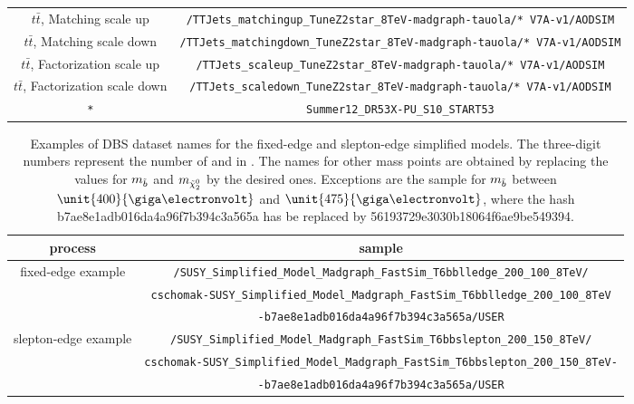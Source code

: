 \begin{table}[htb]
\begin{tabular}{c|c}
$t\bar{t}$, Matching scale up & \verb+/TTJets_matchingup_TuneZ2star_8TeV-madgraph-tauola/* V7A-v1/AODSIM+ \\
$t\bar{t}$, Matching scale down & \verb+/TTJets_matchingdown_TuneZ2star_8TeV-madgraph-tauola/* V7A-v1/AODSIM+ \\
$t\bar{t}$, Factorization scale up & \verb+/TTJets_scaleup_TuneZ2star_8TeV-madgraph-tauola/* V7A-v1/AODSIM+ \\
$t\bar{t}$, Factorization scale down & \verb+/TTJets_scaledown_TuneZ2star_8TeV-madgraph-tauola/* V7A-v1/AODSIM+ \\
\hline
\verb+*+ & \verb+Summer12_DR53X-PU_S10_START53+ \\
\end{tabular}





\end{table} 




\begin{table}[htb] 
\scriptsize
\caption{Examples of DBS dataset names for the fixed-edge and slepton-edge simplified models. The three-digit numbers represent the number of \sbottom and \secondchi in \GeV. The names for other mass points are obtained by replacing the values for $m_{\tilde{b}}$ and $m_{{\tilde{\chi}^0_2}}$ by the desired ones. Exceptions are the sample for $m_{\tilde{b}}$ between $\unit{400}{\giga\electronvolt}$ and $\unit{475}{\giga\electronvolt}$, where the hash b7ae8e1adb016da4a96f7b394c3a565a has be replaced by 56193729e3030b18064f6ae9be549394.}
\label{appTab:MCSamples2}
\begin{tabular}{c|c}
 process & sample \\
\hline 
 \multirow{3}{*}{fixed-edge example} & \verb+/SUSY_Simplified_Model_Madgraph_FastSim_T6bblledge_200_100_8TeV/+\\ & \verb+cschomak-SUSY_Simplified_Model_Madgraph_FastSim_T6bblledge_200_100_8TeV+\\ & \verb+-b7ae8e1adb016da4a96f7b394c3a565a/USER+\\
 \multirow{3}{*}{slepton-edge example} & \verb+/SUSY_Simplified_Model_Madgraph_FastSim_T6bbslepton_200_150_8TeV/+\\ & \verb+cschomak-SUSY_Simplified_Model_Madgraph_FastSim_T6bbslepton_200_150_8TeV-+\\ & \verb+-b7ae8e1adb016da4a96f7b394c3a565a/USER+\\
\end{tabular}


\end{table} 
